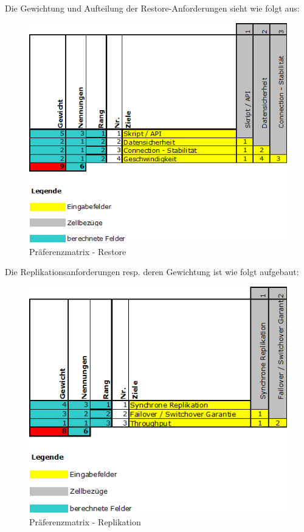 \begin{flushleft}
    Die Gewichtung und Aufteilung der Restore-Anforderungen sieht wie folgt aus:
    \begin{figure}[H]
        \centering
        \includegraphics[width=1\linewidth]{source/implementation/evaluation/requirements/preference_matrix_restore}
        \caption{Präferenzmatrix - Restore}
        \label{fig:preference_matrix_restore}
    \end{figure}
\end{flushleft}
\begin{flushleft}
    Die Replikationsanforderungen resp.
    deren Gewichtung ist wie folgt aufgebaut:
    \begin{figure}[H]
        \centering
        \includegraphics[width=1\linewidth]{source/implementation/evaluation/requirements/preference_matrix_replication}
        \caption{Präferenzmatrix - Replikation}
        \label{fig:preference_matrix_replication}
    \end{figure}
\end{flushleft}
